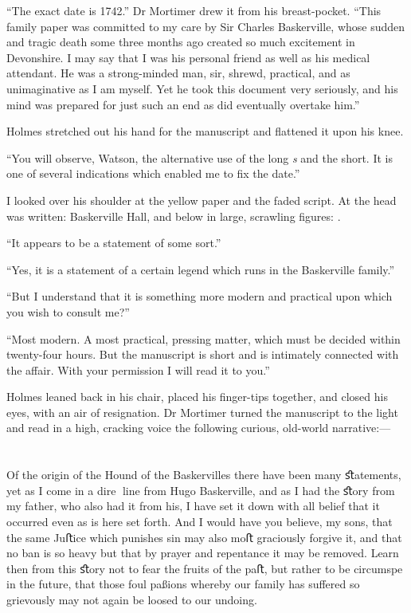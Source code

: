 \documentclass[paper=5.5in:8.5in,BCOR=7mm,twoside,DIV=calc,12pt,usegeometry,openany,chapterprefix,endperiod,headings=big]{scrbook} %
\begin{document}
\enquote{The exact date is 1742.} Dr Mortimer drew it from his breast-pocket. \enquote{This family paper was committed to my care by Sir Charles Baskerville, whose sudden and tragic death some three months ago created so much excitement in Devonshire. I may say that I was his personal friend as well as his medical attendant. He was a strong-minded man, sir, shrewd, practical, and as unimaginative as I am myself. Yet he took this document very seriously, and his mind was prepared for just such an end as did eventually overtake him.}

Holmes stretched out his hand for the manuscript and flattened it upon his knee.

\enquote{You will observe, Watson, the alternative use of the long \textit{s} and the short. It is one of several indications which enabled me to fix the date.}

I looked over his shoulder at the yellow paper and the faded script. At the head was written: \oldfont Baskerville Hall\normalfont, and below in large, scrawling figures: . \normalfont

\enquote{It appears to be a statement of some sort.}

\enquote{Yes, it is a statement of a certain legend which runs in the Baskerville family.}

\enquote{But I understand that it is something more modern and practical upon which you wish to consult me?}

\enquote{Most modern. A most practical, pressing matter, which must be decided within twenty-four hours. But the manuscript is short and is intimately connected with the affair. With your permission I will read it to you.}

Holmes leaned back in his chair, placed his finger-tips together, and closed his eyes, with an air of resignation. Dr Mortimer turned the manuscript to the light and read in a high, cracking voice the following curious, old-world narrative:--- \\
~\\
~\\
\oldfont
Of the origin of the Hound of the Baskervilles there have been many ﬆatements, yet as I come in a dire line from Hugo Baskerville, and as I had the ﬆory from my father, who also had it from his, I have set it down with all belief that it occurred even as is here set forth. And I would have you believe, my sons, that the same Juﬅice which punishes sin may also moﬅ graciously forgive it, and that no ban is so heavy but that by prayer and repentance it may be removed. Learn then from this ﬆory not to fear the fruits of the paﬅ, but rather to be circumspe in the future, that those foul paßions whereby our family has suﬀered so grievously may not again be loosed to our undoing.
\end{document}
